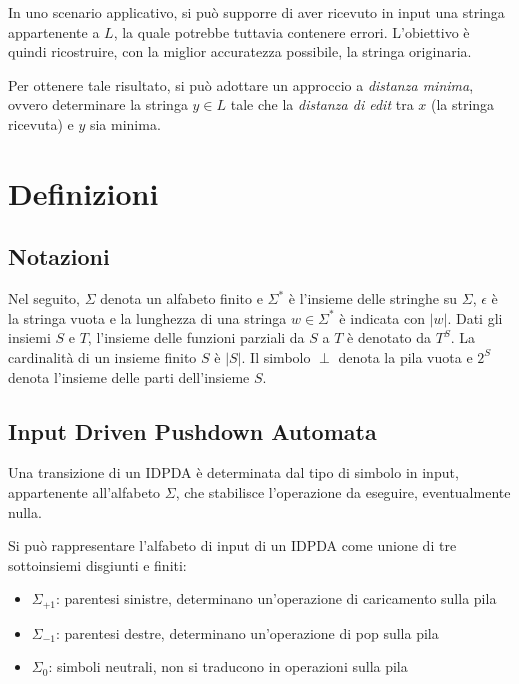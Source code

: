 \documentclass[a4paper,12pt]{report}
\theoremstyle{propositionstyle}
\begin{document}
    In uno scenario applicativo, si può supporre di aver ricevuto in input una stringa appartenente a $L$, la quale potrebbe tuttavia contenere errori.
    L'obiettivo è quindi ricostruire, con la miglior accuratezza possibile, la stringa originaria.

    Per ottenere tale risultato, si può adottare un approccio a \emph{distanza minima}, ovvero determinare la stringa $y \in L$ tale che la \textit{distanza di edit} tra $x$ (la stringa ricevuta) e $y$ sia minima.

    \chapter{Definizioni}

    \section{Notazioni}
    
    Nel seguito, $\Sigma$ denota un alfabeto finito e $\Sigma^*$ è l'insieme delle stringhe su $\Sigma$, $\epsilon$ è la stringa vuota e la lunghezza di una stringa $w \in \Sigma^*$ è  indicata con $|w|$. Dati gli insiemi $S$ e $T$, l'insieme delle funzioni parziali da $S$ a $T$ è denotato da $T^S$. La cardinalità di un insieme finito $S$ è $|S|$. Il simbolo $\perp$ denota la pila vuota e $2^S$ denota l'insieme delle parti dell'insieme $S$.

    \section{Input Driven Pushdown Automata}

    Una transizione di un IDPDA è determinata dal tipo di simbolo in input, appartenente all'alfabeto $\Sigma$, che stabilisce l'operazione da eseguire, eventualmente nulla.
    
    Si può rappresentare l'alfabeto di input di un IDPDA come unione di tre sottoinsiemi disgiunti e finiti:

    \begin{itemize}
        \item $\Sigma_{+1}$: parentesi sinistre, determinano un'operazione di caricamento sulla pila
        \item $\Sigma_{-1}$: parentesi destre, determinano un'operazione di pop sulla pila
        \item $\Sigma_{0}$: simboli neutrali, non si traducono in operazioni sulla pila
    \end{itemize}
\end{document}
